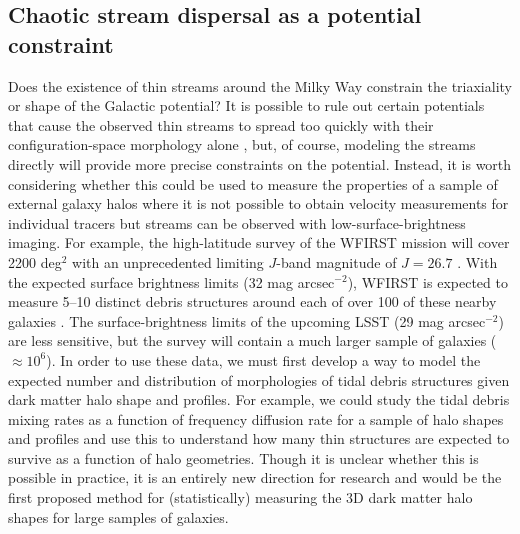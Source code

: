 
\subsection{Chaotic stream dispersal as a potential constraint}

Does the existence of thin streams around the Milky Way constrain the triaxiality or shape of the Galactic potential? It is possible to rule out certain potentials that cause the observed thin streams to spread too quickly with their configuration-space morphology alone \citep[e.g.][]{pearson15}, but, of course, modeling the streams directly will provide more precise constraints on the potential. Instead, it is worth considering whether this could be used to measure the properties of a sample of external galaxy halos where it is not possible to obtain velocity measurements for individual tracers but streams can be observed with low-surface-brightness imaging. For example, the high-latitude survey of the WFIRST mission will cover 2200 deg$^2$ with an unprecedented limiting $J$-band magnitude of $J=26.7$ \citep{spergel15}. With the expected surface brightness limits (32 mag arcsec$^{-2}$), WFIRST is expected to measure 5--10 distinct debris structures around each of over 100 of these nearby galaxies \citep{johnston08}. The surface-brightness limits of the upcoming LSST (29 mag arcsec$^{-2}$) are less sensitive, but the survey will contain a much larger sample of galaxies ($\approx$$10^6$). In order to use these data, we must first develop a way to model the expected number and distribution of morphologies of tidal debris structures given dark matter halo shape and profiles. For example, we could study the tidal debris mixing rates as a function of frequency diffusion rate for a sample of halo shapes and profiles and use this to understand how many thin structures are expected to survive as a function of halo geometries. Though it is unclear whether this is possible in practice, it is an entirely new direction for research and would be the first proposed method for (statistically) measuring the 3D dark matter halo shapes for large samples of galaxies.

%
%

%
%
